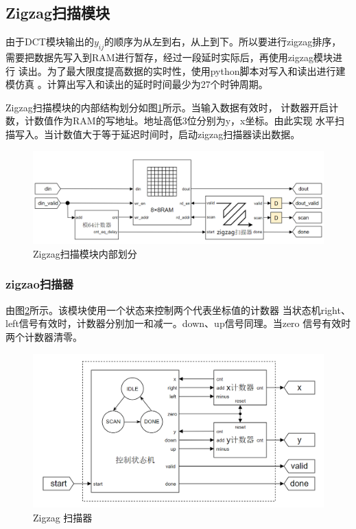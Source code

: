 \documentclass{article}
\numberwithin {equation}{section}
\begin{document}
\begin{spacing}{1.25}
    \subsection{Zigzag扫描模块}
      \vspace{1em}
      由于DCT模块输出的$y_{ij}$的顺序为从左到右，从上到下。所以要进行zigzag排序，
      需要把数据先写入到RAM进行暂存，经过一段延时实际后，再使用zigzag模块进行
      读出。为了最大限度提高数据的实时性，使用python脚本对写入和读出进行建模仿真
      。计算出写入和读出的延时时间最少为27个时钟周期。

      Zigzag扫描模块的内部结构划分如图\ref{zigzag module}所示。当输入数据有效时，
      计数器开启计数，计数值作为RAM的写地址。地址高低3位分别为y，x坐标。由此实现
      水平扫描写入。当计数值大于等于延迟时间时，启动zigzag扫描器读出数据。
      \begin{figure}[H]
        \centering
        \includegraphics[scale=0.4]{./pictures/zigzagModule.png}
        \caption{Zigzag扫描模块内部划分}
        \label{zigzag module}
      \end{figure}
      
      \subsubsection{zigzao扫描器}
        \vspace{1em}
        由图\ref{scanner}所示。该模块使用一个状态来控制两个代表坐标值的计数器
        当状态机right、left信号有效时，计数器分别加一和减一。down、up信号同理。当zero
        信号有效时两个计数器清零。
        \begin{figure}[H]
          \centering
          \includegraphics[scale=0.4]{./pictures/scanner.png}
          \caption{Zigzag 扫描器}
          \label{scanner}
        \end{figure}


\end{spacing}
\end{document}
